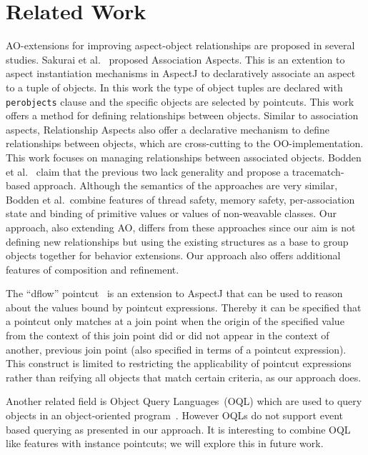 \documentclass{acm_proc_article-sp}
\begin{document}
\section{Related Work}
AO-extensions for improving aspect-object relationships are proposed in several studies. Sakurai et al.~\cite{sakurai2004association} proposed Association Aspects. This is an extention to aspect instantiation mechanisms in AspectJ to declaratively associate an aspect to a tuple of objects. In this work the type of object tuples are declared with \lstinline{perobjects} clause and the specific objects are selected by pointcuts. This work offers a method for defining relationships between objects. Similar to association aspects, Relationship Aspects \cite{pearce2006relationship} also offer a declarative mechanism to define relationships between objects, which are cross-cutting to the OO-implementation. This work focuses on managing relationships between associated objects. Bodden et al.~ \cite{bodden2008relational} claim that the previous two lack generality and propose a tracematch-based approach. Although the semantics of the approaches are very similar, Bodden et al.\ combine features of thread safety, memory safety, per-association state and binding of primitive values or values of non-weavable classes. Our approach, also extending AO, differs from these approaches since our aim is not defining new relationships but using the existing structures as a base to group objects together for behavior extensions. Our approach also offers additional features of composition and refinement.

The ``dflow'' pointcut~\cite{kawauchi:aosd-aosdsec04} is an extension to AspectJ that can be used to reason about the values bound by pointcut expressions. Thereby it can be specified that a pointcut only matches at a join point when the origin of the specified value from the context of this join point did or did not appear in the context of another, previous join point (also specified in terms of a pointcut expression). This construct is limited to restricting the applicability of pointcut expressions rather than reifying all objects that match certain criteria, as our approach does.

Another related field is Object Query Languages~(OQL) which are used to query objects in an object-oriented program~\cite{cluet1998designing}. However OQLs do not support event based querying as presented in our approach. It is interesting to combine  OQL like features with instance pointcuts; we will explore this in future work. 
\end{document}
